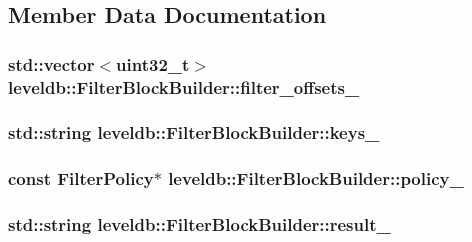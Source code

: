 \subsection{Member Data Documentation}
\hypertarget{classleveldb_1_1_filter_block_builder_ac53c5d18c650072ad09596bf8c3f0e7a}{
\subsubsection[{filter\-\_\-offsets\-\_\-}]{\setlength{\rightskip}{0pt plus 5cm}std\-::vector$<${\bf uint32\-\_\-t}$>$ leveldb\-::\-Filter\-Block\-Builder\-::filter\-\_\-offsets\-\_\-\hspace{0.3cm}{\ttfamily [private]}}}\label{classleveldb_1_1_filter_block_builder_ac53c5d18c650072ad09596bf8c3f0e7a}
\hypertarget{classleveldb_1_1_filter_block_builder_a948705862c1b6c371e6044f588de489a}{
\subsubsection[{keys\-\_\-}]{\setlength{\rightskip}{0pt plus 5cm}std\-::string leveldb\-::\-Filter\-Block\-Builder\-::keys\-\_\-\hspace{0.3cm}{\ttfamily [private]}}}\label{classleveldb_1_1_filter_block_builder_a948705862c1b6c371e6044f588de489a}
\hypertarget{classleveldb_1_1_filter_block_builder_ae1fcb392ca7421a33699f516e3c724e0}{
\subsubsection[{policy\-\_\-}]{\setlength{\rightskip}{0pt plus 5cm}const {\bf Filter\-Policy}$\ast$ leveldb\-::\-Filter\-Block\-Builder\-::policy\-\_\-\hspace{0.3cm}{\ttfamily [private]}}}\label{classleveldb_1_1_filter_block_builder_ae1fcb392ca7421a33699f516e3c724e0}
\hypertarget{classleveldb_1_1_filter_block_builder_ad8230068e41814f72ad4097803dfe382}{
\subsubsection[{result\-\_\-}]{\setlength{\rightskip}{0pt plus 5cm}std\-::string leveldb\-::\-Filter\-Block\-Builder\-::result\-\_\-\hspace{0.3cm}{\ttfamily [private]}}}\label{classleveldb_1_1_filter_block_builder_ad8230068e41814f72ad4097803dfe382}
